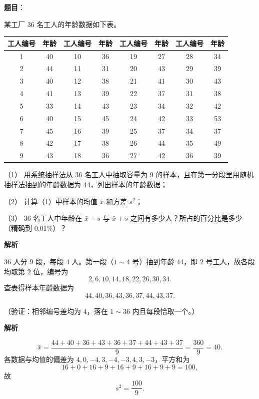 \begin{answer}

\textbf{题目}：

某工厂 36 名工人的年龄数据如下表。

\begin{center}
\begingroup\setlength{\tabcolsep}{4pt}
\begin{tabular}{cccccccc}
\toprule
工人编号 & 年龄 & 工人编号 & 年龄 & 工人编号 & 年龄 & 工人编号 & 年龄 \\
\midrule
1 & 40 & 10 & 36 & 19 & 27 & 28 & 34 \\
2 & 44 & 11 & 31 & 20 & 43 & 29 & 39 \\
3 & 40 & 12 & 38 & 21 & 41 & 30 & 43 \\
4 & 41 & 13 & 39 & 22 & 37 & 31 & 38 \\
5 & 33 & 14 & 43 & 23 & 34 & 32 & 42 \\
6 & 40 & 15 & 45 & 24 & 42 & 33 & 53 \\
7 & 45 & 16 & 39 & 25 & 37 & 34 & 37 \\
8 & 42 & 17 & 38 & 26 & 44 & 35 & 49 \\
9 & 43 & 18 & 36 & 27 & 42 & 36 & 39 \\
\bottomrule
\end{tabular}
\endgroup
\end{center}

（1） 用系统抽样法从 36 名工人中抽取容量为 9 的样本，且在第一分段里用随机抽样法抽到的年龄数据为 44，列出样本的年龄数据；

（2） 计算（1）中样本的均值 \(\bar{x}\) 和方差 \(s^2\)；

（3） 36 名工人中年龄在 \(\bar{x}-s\) 与 \(\bar{x}+s\) 之间有多少人？所占的百分比是多少（精确到 \(0.01\%\)）？

\textbf{解析}


\(36\) 人分 \(9\) 段，每段 \(4\) 人。第一段（\(1\sim4\) 号）抽到年龄 \(44\)，即 \(2\) 号工人，故各段均取第 \(2\) 位，编号为
\nopagebreak[4]
\[
2,6,10,14,18,22,26,30,34.
\]
查表得样本年龄数据为
\nopagebreak[4]
\[
44,40,36,43,36,37,44,43,37.
\]

（验证：相邻编号差均为 \(4\)，落在 \(1\sim36\) 内且每段恰取一个。）


\textbf{解析}

\nopagebreak[4]
\[
\bar{x}=\frac{44+40+36+43+36+37+44+43+37}{9}=\frac{360}{9}=40.
\]
各数据与均值的偏差为 \(4,0,-4,3,-4,-3,4,3,-3\)，平方和为
\nopagebreak[4]
\[
16+0+16+9+16+9+16+9+9=100,
\]
故
\nopagebreak[4]
\[
s^2=\frac{100}{9}.
\]


\end{answer}
